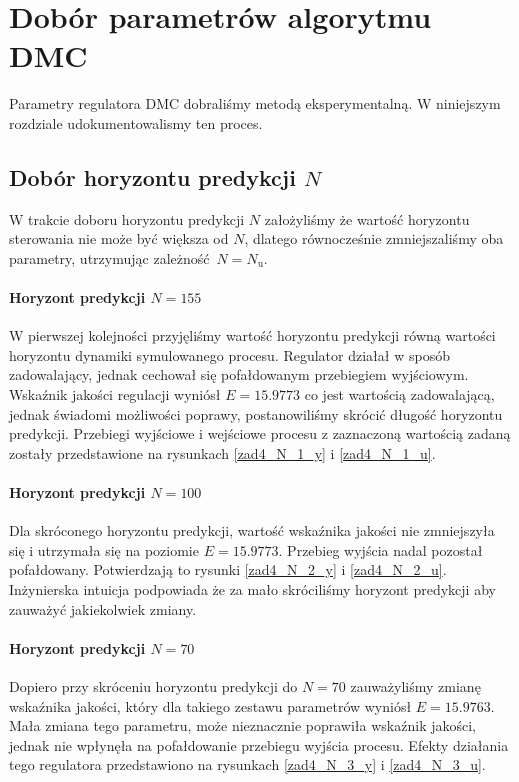 \chapter{Dobór parametrów algorytmu DMC}
\label{zad4}

Parametry regulatora DMC dobraliśmy metodą eksperymentalną.
W niniejszym rozdziale udokumentowalismy ten proces.

\section{Dobór horyzontu predykcji $N$}
W trakcie doboru horyzontu predykcji $N$ założyliśmy że wartość horyzontu sterowania nie może być 
większa od $N$, dlatego równocześnie zmniejszaliśmy oba parametry, utrzymując zależność $N = N_{\mathrm{u}}$.

\subsubsection{Horyzont predykcji $N = \num{155}$}
W pierwszej kolejności przyjęliśmy wartość horyzontu predykcji równą wartości horyzontu dynamiki
symulowanego procesu. Regulator działał w sposób zadowalający, jednak cechował się pofałdowanym
przebiegiem wyjściowym. Wskaźnik jakości regulacji wyniósł $E = \num{15,9773}$ co jest wartością
zadowalającą, jednak świadomi możliwości poprawy, postanowiliśmy skrócić długość horyzontu
predykcji. Przebiegi wyjściowe i wejściowe procesu z zaznaczoną wartością zadaną zostały przedstawione
na rysunkach \ref{zad4_N_1_y} i \ref{zad4_N_1_u}.

\subsubsection{Horyzont predykcji $N = \num{100}$}
Dla skróconego horyzontu predykcji, wartość wskaźnika jakości nie zmniejszyła się i utrzymała się
na poziomie $E = \num{15,9773}$. Przebieg wyjścia nadal pozostał pofałdowany. Potwierdzają to rysunki
\ref{zad4_N_2_y} i \ref{zad4_N_2_u}. Inżynierska intuicja 
podpowiada że za mało skróciliśmy horyzont predykcji aby zauważyć jakiekolwiek zmiany. 

\subsubsection{Horyzont predykcji $N = \num{70}$}
Dopiero przy skróceniu horyzontu predykcji do $N = \num{70}$ zauważyliśmy zmianę wskaźnika jakości, 
który dla takiego zestawu parametrów wyniósł $E = \num{15,9763}$. Mała zmiana tego parametru, może nieznacznie
poprawiła wskaźnik jakości, jednak nie wpłynęła na pofałdowanie przebiegu wyjścia procesu. Efekty działania tego
regulatora przedstawiono na rysunkach \ref{zad4_N_3_y} i \ref{zad4_N_3_u}.

